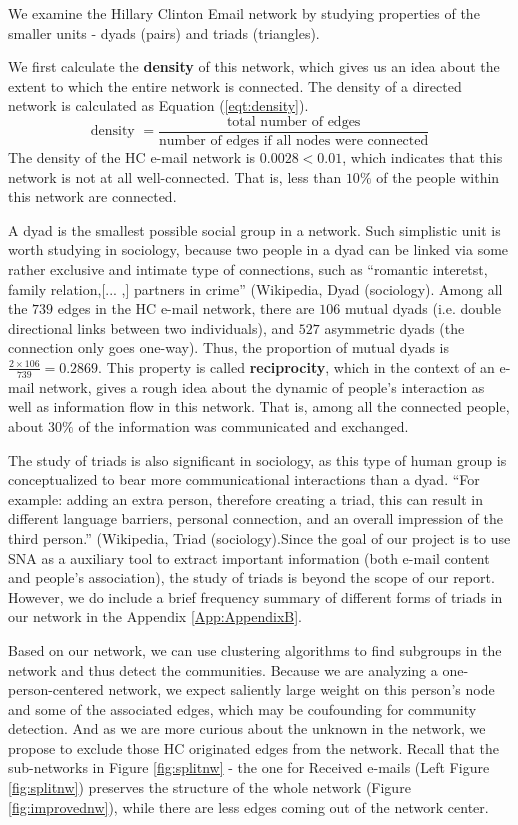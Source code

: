 We examine the Hillary Clinton Email network by studying properties of the smaller units - dyads (pairs) and triads (triangles).   

We first calculate the {\bf density} of this network, which gives us an idea about the extent to which the entire network is connected. The density of a directed network is calculated as Equation (\ref{eqt:density}).
\begin{equation}
\label{eqt:density}
\mbox{density }= \frac{\mbox{total number of edges}}{\mbox{number of edges if all nodes were connected}}
\end{equation}
The density of the HC e-mail network is $0.0028<0.01$, which indicates that this network is not at all well-connected. That is, less than $10\%$ of the people within this network are connected. 

A dyad is the smallest possible social group in a network. Such simplistic unit is worth studying in sociology, because two people in a dyad can be linked via some rather exclusive and intimate type of connections, such as ``romantic interetst, family relation,[... ,] partners in crime'' (Wikipedia, Dyad (sociology)\cite{wiki_dyad}.   Among all the $739$ edges in the HC e-mail network, there are $106$ mutual dyads (i.e. double directional links between two individuals), and $527$ asymmetric dyads (the connection only goes one-way). Thus, the proportion of mutual dyads is $\frac{2 \times 106}{739}=0.2869$. This property is called {\bf reciprocity}, which in the context of an e-mail network, gives a rough idea about the dynamic of people's interaction as well as information flow in this network. That is, among all the connected people, about $30\%$ of the information was communicated and exchanged. 

The study of triads is also significant in sociology, as this type of human group is conceptualized to bear more communicational interactions than a dyad. ``For example: adding an extra person, therefore creating a triad, this can result in different language barriers, personal connection, and an overall impression of the third person.'' (Wikipedia, Triad (sociology)\cite{wiki_triad}.Since the goal of our project is to use SNA as a auxiliary  tool to extract important information (both e-mail content and people's association), the study of triads is beyond the scope of our report. However, we do include a brief frequency summary of different forms of triads in our network in the Appendix \ref{App:AppendixB}.

Based on our network, we can use clustering algorithms to find subgroups in the network and thus detect the communities. Because we are analyzing a one-person-centered network, we expect saliently large weight on this person's node and some of the associated edges, which may be coufounding for community detection. And as we are more curious about the unknown in the network, we propose to exclude those HC originated edges from the network. Recall that the sub-networks in Figure \ref{fig:splitnw} - the one for Received e-mails (Left Figure \ref{fig:splitnw}) preserves the structure of the whole network (Figure \ref{fig:improvednw}), while there are less edges coming out of the network center.  

